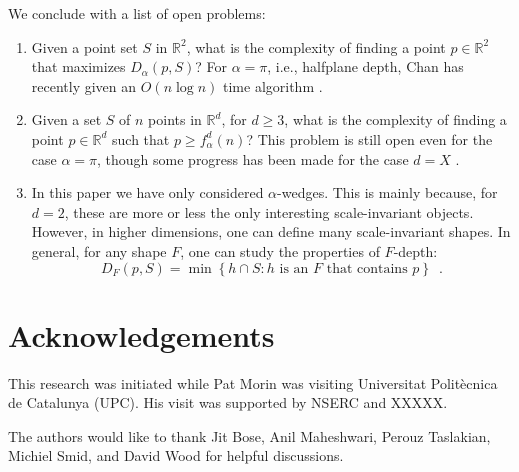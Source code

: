 \documentclass[lotsofwhite]{patmorin}
\begin{document}
We conclude with a list of open problems:

\begin{enumerate}
\item Given a point set $S$ in $\mathbb{R}^2$, what is the complexity
of finding a point $p\in\mathbb{R}^2$ that maximizes $D_\alpha(p,S)$?
For $\alpha=\pi$, i.e., halfplane depth, Chan has recently given an
$O(n\log n)$ time algorithm \cite{c04}.

\item Given a set $S$ of $n$ points in $\mathbb{R}^d$, for $d\ge 3$,
what is the complexity of finding a point $p\in \mathbb{R}^d$ such
that $p\ge f_\alpha^d(n)$?  This problem is still open even for the
case $\alpha=\pi$, though some progress has been made for the case
$d=X$ \cite{X}.

\item In this paper we have only considered $\alpha$-wedges.  This is
mainly because, for $d=2$, these are more or less the only interesting
scale-invariant objects.  However, in higher dimensions, one can
define many scale-invariant shapes.  In general, for any shape $F$,
one can study the properties of $F$-depth:
\[
  D_F(p,S) = \min\left\{ 
     h\cap S : \mbox{$h$ is an $F$ that contains $p$}
  \right\} \enspace .
\] 
\end{enumerate}

\section*{Acknowledgements}

This research was initiated while Pat Morin was visiting Universitat
Polit\`ecnica de Catalunya (UPC).  His visit was supported by NSERC
and XXXXX.  

The authors would like to thank Jit Bose, Anil Maheshwari, Perouz
Taslakian, Michiel Smid, and David Wood for helpful discussions.



\end{document}
